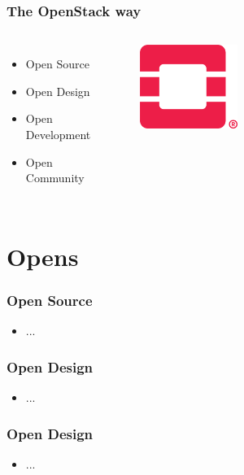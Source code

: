 \documentclass[aspectratio=169,11pt,hyperref={colorlinks=true}]{beamer}
\begin{document}
\begin{frame}
  \frametitle{The OpenStack way}
  \begin{columns}
      \begin{itemize}
          \item{Open Source}
          \item{Open Design}
          \item{Open Development}
          \item{Open Community}
      \end{itemize}
      \begin{figure}
      \begin{center}
        \includegraphics[width=0.4\textwidth]{pictures/OpenStack-Logo-Mark.png}
      \end{center}
      \end{figure}
  \end{columns}
\end{frame}

\section{Opens}
\begin{frame}
  \frametitle{Open Source}
    \begin{itemize}
        \item{...}
    \end{itemize}
\end{frame}

\begin{frame}
  \frametitle{Open Design}
    \begin{itemize}
        \item{...}
    \end{itemize}
\end{frame}

\begin{frame}
  \frametitle{Open Design}
    \begin{itemize}
        \item{...}
    \end{itemize}
\end{frame}
\end{document}
